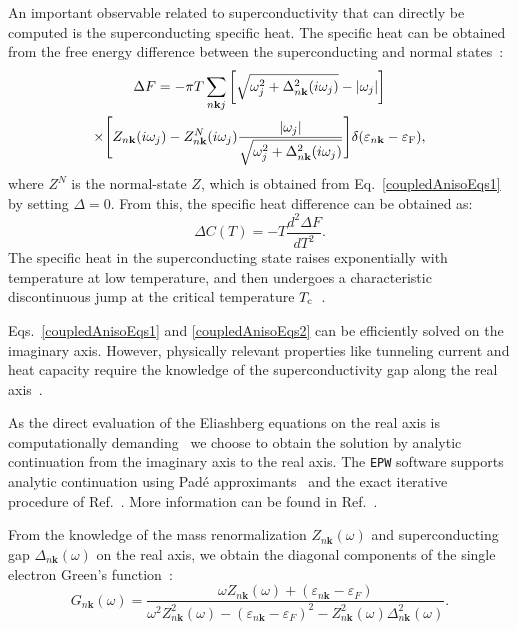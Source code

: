 \documentclass[final,3p,times,twocolumn]{elsarticle}
\begin{document}
An important observable related to superconductivity that can directly be computed is the superconducting specific heat. The specific heat can be obtained from
the free energy difference between the superconducting and normal states~\cite{Bardeen1964,Choi2003,Marsiglio2008}:
\begin{multline}\label{free_energy}
\Delta F = -\pi T \sum_{ n\mathbf{k}j} \bigg[ \sqrt{\omega_j^2 + \Delta_{n\mathbf{k}}^2(i\omega_j)} - |\omega_j| \bigg]\\
\times \Bigg[ Z_{n\mathbf{k}}(i\omega_j) - Z_{n\mathbf{k}}^N(i\omega_j)\frac{|\omega_j|}{\sqrt{\omega_j^2 + \Delta_{n\mathbf{k}}^2(i\omega_j)} }  \Bigg]\delta(\varepsilon_{n\mathbf{k}}-\varepsilon_{\rm F}),
\end{multline}
where $Z^N$ is the normal-state $Z$, which is obtained from Eq.~\eqref{coupledAnisoEqs1} by setting $\Delta = 0$.
From this, the specific heat difference can be obtained as:
\begin{equation}\label{specific_heat}
\Delta C(T) = -T \frac{d^2 \Delta F}{dT^2}.
\end{equation}
The specific heat in the superconducting state raises exponentially with temperature at low temperature, and then undergoes a characteristic discontinuous jump at the critical temperature $T_{\rm c}$~\cite{Phillips1959}. 

Eqs.~\eqref{coupledAnisoEqs1} and \eqref{coupledAnisoEqs2} can be efficiently solved on the imaginary axis. However, physically relevant properties like tunneling current and heat capacity require the knowledge of the superconductivity gap along the real axis~\cite{McMillan1965}.

As the direct evaluation of the Eliashberg equations on the real axis is computationally demanding~\cite{Schrieffer1963,Scalapino1966,Holcomb1996} we choose to obtain the solution by analytic continuation from the imaginary axis to the real axis. The \texttt{EPW} software supports analytic continuation using Pad\'e approximants~\cite{Vidberg1977,Leavens1985} and the exact iterative procedure of Ref.~\cite{Marsiglio1988}. More information can be found in Ref.~\cite{Margine2013}.   

From the knowledge of the mass renormalization $Z_{n\mathbf{k}}(\omega)$ and superconducting gap $\Delta_{n\mathbf{k}}(\omega)$ on the real axis, we obtain the diagonal components of the single electron Green's function~\cite{Scalapino1969,Marsiglio2008}:
\begin{equation}\label{diagonalGreen}
G_{n\mathbf{k}}(\omega) = \frac{\omega Z_{n\mathbf{k}}(\omega)+(\varepsilon_{n\mathbf{k}}-\varepsilon_F)}{\omega^2 Z_{n\mathbf{k}}^2(\omega)-(\varepsilon_{n\mathbf{k}}-\varepsilon_F)^2-Z_{n\mathbf{k}}^2(\omega)\Delta_{n\mathbf{k}}^2(\omega)}.
\end{equation}
\end{document}
